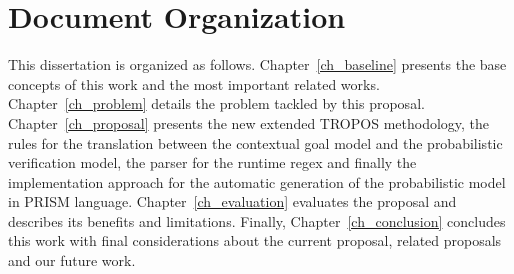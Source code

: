 \section{Document Organization}

This dissertation is organized as follows. Chapter~\ref{ch_baseline} presents the base concepts of this work and the most important related works. Chapter~\ref{ch_problem} details the problem tackled by this proposal. Chapter~\ref{ch_proposal} presents the new extended TROPOS methodology, the rules for the translation between the contextual goal model and the probabilistic verification model, the parser for the runtime regex and finally the implementation approach for the automatic generation of the probabilistic model in PRISM language. Chapter~\ref{ch_evaluation} evaluates the proposal and describes its benefits and limitations. Finally, Chapter~\ref{ch_conclusion} concludes this work with final considerations about the current proposal, related proposals and our future work.